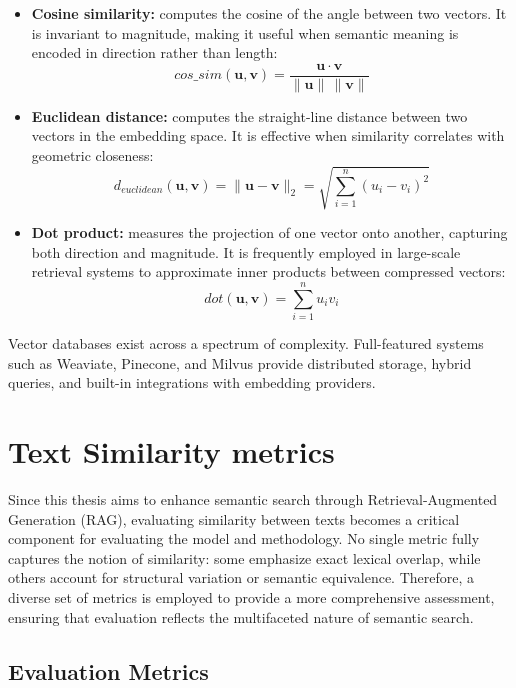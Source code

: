 \begin{itemize}
    \item \textbf{Cosine similarity:} computes the cosine of the angle between two vectors. It is invariant to magnitude, making it useful when semantic meaning is encoded in direction rather than length:  
    \[
        \textit{cos\_sim}(\mathbf{u}, \mathbf{v}) = \frac{\mathbf{u} \cdot \mathbf{v}}{\|\mathbf{u}\| \, \|\mathbf{v}\|}
    \]
    
    \item \textbf{Euclidean distance:} computes the straight-line distance between two vectors in the embedding space. It is effective when similarity correlates with geometric closeness:  
    \[
        d_{\textit{euclidean}}(\mathbf{u}, \mathbf{v}) = \|\mathbf{u} - \mathbf{v}\|_2 = \sqrt{\sum_{i=1}^n (u_i - v_i)^2}
    \]
    
    \item \textbf{Dot product:} measures the projection of one vector onto another, capturing both direction and magnitude. It is frequently employed in large-scale retrieval systems to approximate inner products between compressed vectors:  
    \[
        \textit{dot}(\mathbf{u}, \mathbf{v}) = \sum_{i=1}^n u_i v_i
    \]
\end{itemize}


Vector databases exist across a spectrum of complexity. Full-featured systems such as Weaviate, Pinecone, and Milvus provide distributed storage, hybrid queries, and built-in integrations with embedding providers.

\section{Text Similarity metrics}
\label{sec:text-similarity-metrics}
Since this thesis aims to enhance semantic search through Retrieval-Augmented Generation (\gls{RAG}), 
evaluating similarity between texts becomes a critical component for evaluating the model and methodology. 
No single metric fully captures the notion of similarity: some emphasize exact lexical overlap, 
while others account for structural variation or semantic equivalence. 
Therefore, a diverse set of metrics is employed to provide a more comprehensive assessment, 
ensuring that evaluation reflects the multifaceted nature of semantic search.

\subsection{Evaluation Metrics}

